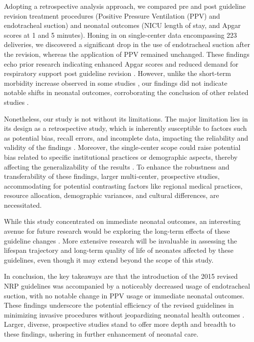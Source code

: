 \documentclass[11pt]{article}
\begin{document}
Adopting a retrospective analysis approach, we compared pre and post guideline revision treatment procedures (Positive Pressure Ventilation (PPV) and endotracheal suction) and neonatal outcomes (NICU length of stay, and Apgar scores at 1 and 5 minutes). Honing in on single-center data encompassing 223 deliveries, we discovered a significant drop in the use of endotracheal suction after the revision, whereas the application of PPV remained unchanged. These findings echo prior research indicating enhanced Apgar scores and reduced demand for respiratory support post guideline revision \cite{Myers2020ImpactOT}. However, unlike the short-term morbidity increase observed in some studies \cite{Smith2019DevelopmentOA}, our findings did not indicate notable shifts in neonatal outcomes, corroborating the conclusion of other related studies \cite{Myers2020ImpactOT}.

Nonetheless, our study is not without its limitations. The major limitation lies in its design as a retrospective study, which is inherently susceptible to factors such as potential bias, recall errors, and incomplete data, impacting the reliability and validity of the findings \cite{Smith2019DevelopmentOA, Bell2000PracticeGF}. Moreover, the single-center scope could raise potential bias related to specific institutional practices or demographic aspects, thereby affecting the generalizability of the results \cite{Barkun2019ManagementON}. To enhance the robustness and transferability of these findings, larger multi-center, prospective studies, accommodating for potential contrasting factors like regional medical practices, resource allocation, demographic variances, and cultural differences, are necessitated. 

While this study concentrated on immediate neonatal outcomes, an interesting avenue for future research would be exploring the long-term effects of these guideline changes \cite{Boundy2016KangarooMC}. More extensive research will be invaluable in assessing the lifespan trajectory and long-term quality of life of neonates affected by these guidelines, even though it may extend beyond the scope of this study.

In conclusion, the key takeaways are that the introduction of the 2015 revised NRP guidelines was accompanied by a noticeably decreased usage of endotracheal suction, with no notable change in PPV usage or immediate neonatal outcomes. These findings underscore the potential efficiency of the revised guidelines in minimizing invasive procedures without jeopardizing neonatal health outcomes \cite{Ranjeva2018EconomicBO}. Larger, diverse, prospective studies stand to offer more depth and breadth to these findings, ushering in further enhancement of neonatal care.
\end{document}
